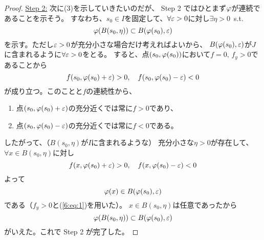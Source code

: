 \documentclass[report]{jlreq}
\begin{document}
\begin{proof}
    \underline{Step 2:} 次に(3)を示していきたいのだが、
    Step 2 ではひとまず$\varphi$が連続であることを示そう。
    すなわち、$s_0 \in I$を固定して、$\forall \varepsilon > 0$に対し$\exists \eta > 0$\, s.t.
    \begin{equation}
        \varphi(B(s_0, \eta)) \subset B(\varphi(s_0), \varepsilon)
    \end{equation}
    を示す。ただし$\varepsilon > 0$が充分小さな場合だけ考えればよいから、
    $B(\varphi(s_0), \varepsilon)$が$J$に含まれるように$\forall \varepsilon > 0$をとる。
    すると、点$(s_0, \varphi(s_0))$において$f = 0,\, f_y > 0$であることから
    \begin{equation}
        f(s_0, \varphi(s_0) + \varepsilon) > 0,\quad
        f(s_0, \varphi(s_0) - \varepsilon) < 0
    \end{equation}
    が成り立つ。このことと$f$の連続性から、
    \begin{enumerate}
        \item 点$(s_0, \varphi(s_0) + \varepsilon)$の充分近くでは常に$f > 0$であり、
        \item 点$(s_0, \varphi(s_0) - \varepsilon)$の充分近くでは常に$f < 0$である。
    \end{enumerate}
    したがって、（$B(s_0, \eta)$が$I$に含まれるような）
    充分小さな$\eta > 0$が存在して、$\forall x \in B(s_0, \eta)$に対し
    \begin{equation}
        f(x, \varphi(s_0) + \varepsilon) > 0,\quad
        f(x, \varphi(s_0) - \varepsilon) < 0
    \end{equation}
    よって
    \begin{equation}
        \varphi(x) \in B(\varphi(s_0), \varepsilon)
    \end{equation}
    である（$f_y > 0$と(\ref{6:eq:1})を用いた）。
    $x \in B(s_0, \eta)$は任意であったから
    \begin{equation}
        \varphi(B(s_0, \eta)) \subset B(\varphi(s_0), \varepsilon)
    \end{equation}
    がいえた。これで Step 2 が完了した。


\end{proof}
\end{document}

